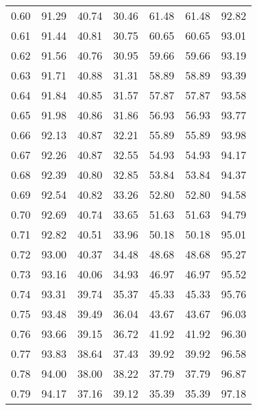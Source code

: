 \begin{tabular}{|c|c|c|c|c|c|c|}
      0.60 &     91.29 &     40.74 &      30.46 &   61.48 &      61.48 &         92.82 \\
      0.61 &     91.44 &     40.81 &      30.75 &   60.65 &      60.65 &         93.01 \\
      0.62 &     91.56 &     40.76 &      30.95 &   59.66 &      59.66 &         93.19 \\
      0.63 &     91.71 &     40.88 &      31.31 &   58.89 &      58.89 &         93.39 \\
      0.64 &     91.84 &     40.85 &      31.57 &   57.87 &      57.87 &         93.58 \\
      0.65 &     91.98 &     40.86 &      31.86 &   56.93 &      56.93 &         93.77 \\
      0.66 &     92.13 &     40.87 &      32.21 &   55.89 &      55.89 &         93.98 \\
      0.67 &     92.26 &     40.87 &      32.55 &   54.93 &      54.93 &         94.17 \\
      0.68 &     92.39 &     40.80 &      32.85 &   53.84 &      53.84 &         94.37 \\
      0.69 &     92.54 &     40.82 &      33.26 &   52.80 &      52.80 &         94.58 \\
      0.70 &     92.69 &     40.74 &      33.65 &   51.63 &      51.63 &         94.79 \\
      0.71 &     92.82 &     40.51 &      33.96 &   50.18 &      50.18 &         95.01 \\
      0.72 &     93.00 &     40.37 &      34.48 &   48.68 &      48.68 &         95.27 \\
      0.73 &     93.16 &     40.06 &      34.93 &   46.97 &      46.97 &         95.52 \\
      0.74 &     93.31 &     39.74 &      35.37 &   45.33 &      45.33 &         95.76 \\
      0.75 &     93.48 &     39.49 &      36.04 &   43.67 &      43.67 &         96.03 \\
      0.76 &     93.66 &     39.15 &      36.72 &   41.92 &      41.92 &         96.30 \\
      0.77 &     93.83 &     38.64 &      37.43 &   39.92 &      39.92 &         96.58 \\
      0.78 &     94.00 &     38.00 &      38.22 &   37.79 &      37.79 &         96.87 \\
      0.79 &     94.17 &     37.16 &      39.12 &   35.39 &      35.39 &         97.18 \\

\end{tabular}
